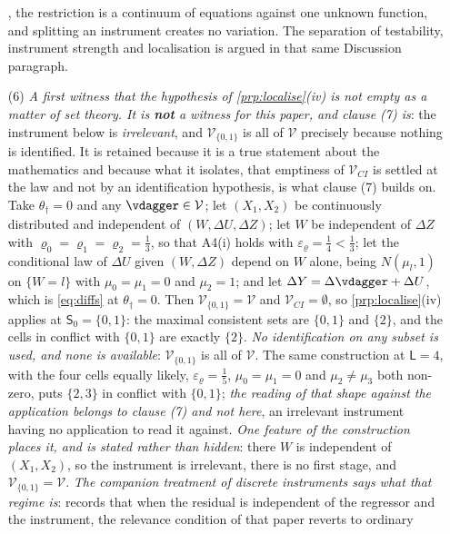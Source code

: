 \begin{remark}
\begin{enumerate}
, the restriction is a continuum of equations against one unknown function, and splitting an
instrument creates no variation. The separation of testability, instrument strength and localisation is
argued in that same Discussion paragraph.
\item[(6)] \emph{A first witness that the hypothesis of \cref{prp:localise}\textup{(iv)} is not empty as a
matter of set theory. It is \textbf{not} a witness for this paper, and clause \textup{(7)} is}: the
instrument below is \emph{irrelevant}, and $\mathcal V_{\{0,1\}}$ is all of $\mathcal V$ precisely because
nothing is identified. It is retained because it is a true statement about the mathematics and because
what it isolates, that emptiness of $\mathcal V_{CI}$ is settled at the law and not by an
identification hypothesis, is what clause \textup{(7)} builds on.
Take $\theta_\dagger=0$ and any $\vdagger\in\mathcal V$;
let $(X_1,X_2)$ be continuously distributed and independent of $(W,\Delta U,\Delta Z)$; let $W$ be
independent of $\Delta Z$ with $\varrho_0=\varrho_1=\varrho_2=\tfrac13$, so that A4(i) holds with
$\varepsilon_\varrho=\tfrac14<\tfrac13$; let the conditional law of $\Delta U$ given $(W,\Delta Z)$
depend on $W$ alone, being $N(\mu_l,1)$ on $\{W=l\}$ with $\mu_0=\mu_1=0$ and $\mu_2=1$; and let
$\Delta Y=\Delta\vdagger+\Delta U$, which is
\eqref{eq:diffs} at $\theta_\dagger=0$. Then $\mathcal V_{\{0,1\}}=\mathcal V$ and
$\mathcal V_{CI}=\emptyset$, so \cref{prp:localise}\textup{(iv)} applies at $\mathsf S_0=\{0,1\}$: the
maximal consistent sets are $\{0,1\}$ and $\{2\}$, and the cells in conflict with $\{0,1\}$ are exactly
$\{2\}$. \emph{No identification on any subset is used, and none is available}: $\mathcal V_{\{0,1\}}$
is all of $\mathcal V$. The same construction at $\mathsf L=4$, with the four cells equally likely,
$\varepsilon_\varrho=\tfrac15$, $\mu_0=\mu_1=0$ and $\mu_2\neq\mu_3$ both non-zero, puts $\{2,3\}$ in
conflict with $\{0,1\}$; \emph{the reading of that shape against the application belongs to clause
\textup{(7)} and not here}, an irrelevant instrument having no application to read it against.
\emph{One feature of the construction places it, and is stated rather than hidden}: there $W$ is
independent of $(X_1,X_2)$, so the instrument is irrelevant, there is no first stage, and
$\mathcal V_{\{0,1\}}=\mathcal V$. \emph{The companion treatment of discrete instruments says what that
regime is}: \citet[Remark~2]{centorrinofeveflorens2019} records that when the residual is independent of
the regressor and the instrument, the relevance condition of that paper reverts to ordinary

\end{enumerate}
\end{remark}
